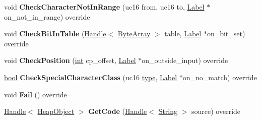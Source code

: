 \begin{DoxyCompactItemize}
\item 
\mbox{\label{classv8_1_1internal_1_1RegExpMacroAssemblerX64_a639b27cc785d92f0ce1bcad24de11ca3}} 
void {\bfseries Check\+Character\+Not\+In\+Range} (uc16 from, uc16 to, \mbox{\hyperlink{classv8_1_1internal_1_1Label}{Label}} $\ast$on\+\_\+not\+\_\+in\+\_\+range) override
\item 
\mbox{\label{classv8_1_1internal_1_1RegExpMacroAssemblerX64_aafef4299ace1bb9c270b7519b1ae2816}} 
void {\bfseries Check\+Bit\+In\+Table} (\mbox{\hyperlink{classv8_1_1internal_1_1Handle}{Handle}}$<$ \mbox{\hyperlink{classv8_1_1internal_1_1ByteArray}{Byte\+Array}} $>$ table, \mbox{\hyperlink{classv8_1_1internal_1_1Label}{Label}} $\ast$on\+\_\+bit\+\_\+set) override
\item 
\mbox{\label{classv8_1_1internal_1_1RegExpMacroAssemblerX64_a2a19399a8694ce777da73c40b89ef5a7}} 
void {\bfseries Check\+Position} (\mbox{\hyperlink{classint}{int}} cp\+\_\+offset, \mbox{\hyperlink{classv8_1_1internal_1_1Label}{Label}} $\ast$on\+\_\+outside\+\_\+input) override
\item 
\mbox{\label{classv8_1_1internal_1_1RegExpMacroAssemblerX64_a0bd47b20b946ac2f37c465cde56ec51c}} 
\mbox{\hyperlink{classbool}{bool}} {\bfseries Check\+Special\+Character\+Class} (uc16 \mbox{\hyperlink{classstd_1_1conditional_1_1type}{type}}, \mbox{\hyperlink{classv8_1_1internal_1_1Label}{Label}} $\ast$on\+\_\+no\+\_\+match) override
\item 
\mbox{\label{classv8_1_1internal_1_1RegExpMacroAssemblerX64_a68b5034fdf3c176e7550e076ba633c61}} 
void {\bfseries Fail} () override
\item 
\mbox{\label{classv8_1_1internal_1_1RegExpMacroAssemblerX64_a5d4f529755d24a93229e46d2457992ac}} 
\mbox{\hyperlink{classv8_1_1internal_1_1Handle}{Handle}}$<$ \mbox{\hyperlink{classv8_1_1internal_1_1HeapObject}{Heap\+Object}} $>$ {\bfseries Get\+Code} (\mbox{\hyperlink{classv8_1_1internal_1_1Handle}{Handle}}$<$ \mbox{\hyperlink{classv8_1_1internal_1_1String}{String}} $>$ source) override

\end{DoxyCompactItemize}
